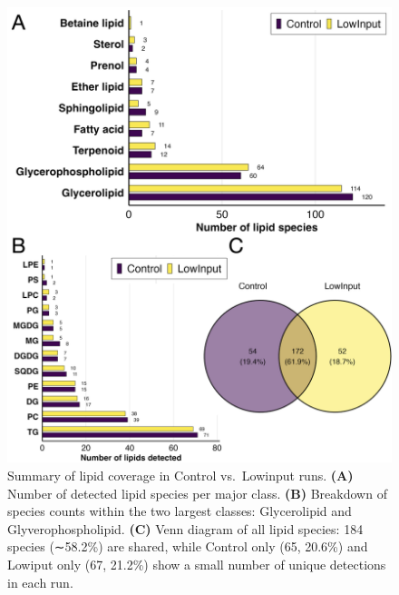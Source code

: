 \documentclass[10pt,letterpaper]{article}
\begin{document}
\begin{itemize}





\begin{figure}[htp]
  \centering
  \includegraphics[width=\textwidth]{fig/supp/SuppFig4.png}
  \caption{
    Summary of lipid coverage in Control vs.\ Lowinput runs. 
    {\bf(A)} Number of detected lipid species per major class.
    {\bf(B)} Breakdown of species counts within the two largest classes: Glycerolipid and Glyverophospholipid.
    {\bf(C)} Venn diagram of all lipid species: 184 species (∼58.2\%) are shared, while Control only (65, 20.6\%) and Lowiput only (67, 21.2\%) show a small number of unique detections in each run.
  }
  \label{fig:S4}
\end{figure}



\end{itemize}
\end{document}
